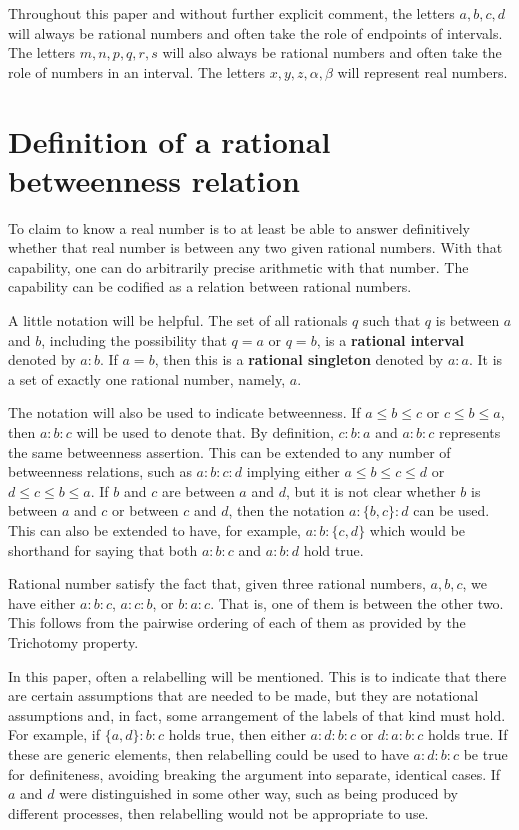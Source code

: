 \documentclass[12pt]{article}
\begin{document}
Throughout this paper and without further explicit comment, the letters $a, b, c, d$ will always be rational numbers and often take the role of endpoints of intervals. The letters $m, n, p, q, r, s$ will also always be rational numbers and often take the role of numbers in an interval. The letters $x, y, z, \alpha, \beta$ will represent real numbers.

\section{Definition of a rational betweenness relation}

To claim to know a real number is to at least be able to answer definitively whether that real number is between any two given rational numbers. With that capability, one can do arbitrarily precise arithmetic with that number. The capability can be codified as a relation between rational numbers. 

A little notation will be helpful. The set of all rationals $q$ such that $q$ is between $a$ and $b$, including the possibility that $q=a$ or $q=b$, is a \textbf{rational interval} denoted by $a:b$. If $a=b$, then this is a \textbf{rational singleton} denoted by $a:a$. It is a set of exactly one rational number, namely, $a$. 

The notation will also be used to indicate betweenness. If $a \leq b \leq c$ or $c \leq b \leq a$, then $a:b:c$ will be used to denote that. By definition, $c:b:a$ and $a:b:c$ represents the same betweenness assertion. This can be extended to any number of betweenness relations, such as $a:b:c:d$ implying either $a \leq b \leq c \leq d$ or $d \leq c \leq b \leq a$. If $b$ and $c$ are between $a$ and $d$, but it is not clear whether $b$ is between $a$ and $c$ or between $c$ and $d$, then the notation $a:\{b,c\}:d$ can be used. This can also be extended to have, for example, $a:b:\{c,d\}$ which would be shorthand for saying that both $a:b:c$ and $a:b:d$ hold true. 

Rational number satisfy the fact that, given three rational numbers, $a, b, c$, we have either $a:b:c$, $a:c:b$, or $b:a:c$. That is, one of them is between the other two. This follows from the pairwise ordering of each of them as provided by the Trichotomy property. 

In this paper, often a relabelling will be mentioned. This is to indicate that there are certain assumptions that are needed to be made, but they are notational assumptions and, in fact, some arrangement of the labels of that kind must hold. For example, if $\{a,d\}:b:c$ holds true, then either $a:d:b:c$ or $d:a:b:c$ holds true. If these are generic elements, then relabelling could be used to have $a:d:b:c$  be  true for definiteness, avoiding breaking the argument into separate, identical cases. If $a$ and $d$ were distinguished in some other way, such as being produced by different processes, then relabelling would not be appropriate to use. 
\end{document}
